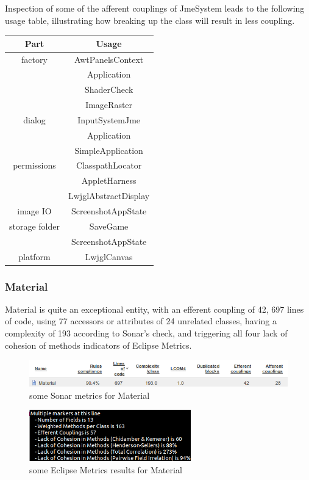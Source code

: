 \documentclass[a4paper, 10pt]{article}
\begin{document}
Inspection of some of the afferent couplings of JmeSystem 
leads to the following usage table, 
illustrating how breaking up the class will result in 
less coupling.

\begin{tabular}{|c|c|}
\hline
\textbf{Part}&\textbf{Usage}\\\hline
factory	& AwtPanelsContext\\\hline
		& Application\\\hline
		& ShaderCheck\\\hline
		& ImageRaster\\\hline
dialog	& InputSystemJme\\\hline
		& Application\\\hline
		& SimpleApplication\\\hline
permissions	& ClasspathLocator\\\hline
		& AppletHarness\\\hline
		& LwjglAbstractDisplay\\\hline
image IO	& ScreenshotAppState\\\hline
storage folder	& SaveGame\\\hline
		& ScreenshotAppState\\\hline
platform	& LwjglCanvas\\\hline
\end{tabular}

\subsubsection{Material}
Material is quite an exceptional entity,
with an efferent coupling of 42,
697 lines of code,
using 77 accessors or attributes of 24 unrelated classes,
having a complexity of 193 according to Sonar's check, and
triggering all four lack of cohesion of methods indicators of Eclipse Metrics.

\begin{figure}[htb!]
\centering
\includegraphics[width=\textwidth]{figures/material-sonar.png}
\vspace{-20pt}
\caption{some Sonar metrics for Material}
\label{fig:material-sonar}
\end{figure}
\vspace{-20pt}
\begin{figure}[htb!]
\centering
\includegraphics[width=70mm]{figures/material-metrics.png}
\vspace{-10pt}
\caption{some Eclipse Metrics results for Material}
\label{fig:material-metrics}
\end{figure}
\end{document}
